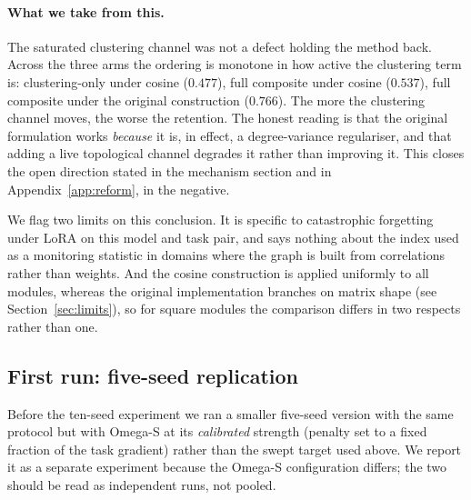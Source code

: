 \documentclass[11pt,a4paper]{article}
\begin{document}
\paragraph{What we take from this.} The saturated clustering channel was not a
defect holding the method back. Across the three arms the ordering is
monotone in how active the clustering term is: clustering-only under cosine
($0.477$), full composite under cosine ($0.537$), full composite under the
original construction ($0.766$). The more the clustering channel moves, the
worse the retention. The honest reading is that the original formulation works
\emph{because} it is, in effect, a degree-variance regulariser, and that adding
a live topological channel degrades it rather than improving it. This closes
the open direction stated in the mechanism section and in
Appendix~\ref{app:reform}, in the negative.

We flag two limits on this conclusion. It is specific to catastrophic
forgetting under LoRA on this model and task pair, and says nothing about the
index used as a monitoring statistic in domains where the graph is built from
correlations rather than weights. And the cosine construction is applied
uniformly to all modules, whereas the original implementation branches on
matrix shape (see Section~\ref{sec:limits}), so for square modules the
comparison differs in two respects rather than one.

\subsection{First run: five-seed replication}
\label{sec:fiveseed}

Before the ten-seed experiment we ran a smaller five-seed version with the
same protocol but with Omega-S at its \emph{calibrated} strength (penalty
set to a fixed fraction of the task gradient) rather than the swept target
used above. We report it as a separate experiment because the Omega-S
configuration differs; the two should be read as independent runs, not
pooled.
\end{document}
